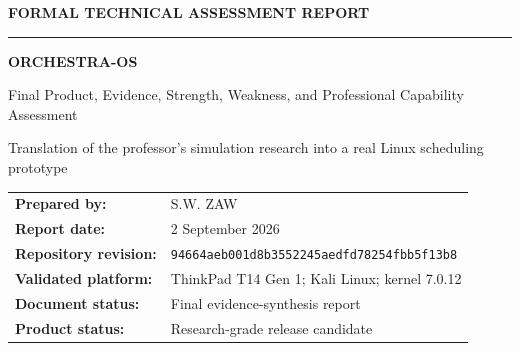 \documentclass[11pt,a4paper,oneside]{report}
\begin{document}
\begin{titlepage}
\thispagestyle{empty}
\vspace*{25mm}
{\Large\bfseries FORMAL TECHNICAL ASSESSMENT REPORT\par}
\vspace{8mm}
\rule{\textwidth}{1.2pt}
\vspace{9mm}
{\Huge\bfseries ORCHESTRA-OS\par}
\vspace{4mm}
{\LARGE Final Product, Evidence, Strength, Weakness, and Professional Capability Assessment\par}
\vspace{9mm}
{\large Translation of the professor's simulation research into a real Linux scheduling prototype\par}
\vfill
\begin{tabular}{@{}ll@{}}
\textbf{Prepared by:} & S.W. ZAW \\
\textbf{Report date:} & 2 September 2026 \\
\textbf{Repository revision:} & \texttt{94664aeb001d8b3552245aedfd78254fbb5f13b8} \\
\textbf{Validated platform:} & ThinkPad T14 Gen 1; Kali Linux; kernel 7.0.12 \\
\textbf{Document status:} & Final evidence-synthesis report \\
\textbf{Product status:} & Research-grade release candidate \\
\end{tabular}
\vspace{16mm}
\begin{center}
\end{center}
\end{titlepage}

\end{document}

